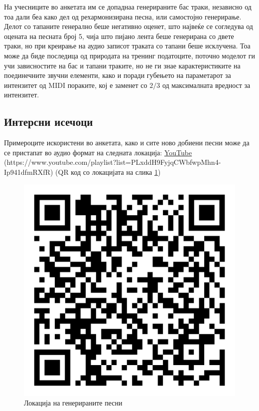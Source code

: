 На учесниците во анкетата им се допаднаа генерираните бас траки, независно од тоа дали беа како дел од рехармонизирана песна, или самостојно генерирање. Делот со тапаните генерално беше негативно оценет, што највеќе се согледува од оцената на песната број 5, чија што пијано лента беше генерирана со двете траки, но при креирање на аудио записот траката со тапани беше исклучена. Тоа може да биде последица од природата на тренинг податоците, поточно моделот ги учи зависностите на бас и тапани траките, но не ги знае карактеристиките на поединечните звучни елементи, како и поради губењето на параметарот за интензитет од MIDI пораките, кој е заменет со $2/3$ од максималната вредност за интензитет.

\newpage
\subsection{Интерсни исечоци}

Примероците искористени во анкетата, како и сите ново добиени песни може да се пристапат во аудио формат на следната локација: \href{https://www.youtube.com/playlist?list=PLxddH9FyjqCWbfwpMhn4-Ip941dfmRXfR}{YouTube} (https://www.youtube.com/playlist?list=PLxddH9FyjqCWbfwpMhn4-Ip941dfmRXfR) (QR код со локацијата на слика \ref{fig:qr_code})

\begin{figure}[H]
	\centering
    \includegraphics[scale=0.18]{images/playlist_qr_code.png}
	\caption{Локација на генерираните песни}
	\label{fig:qr_code}
\end{figure}

